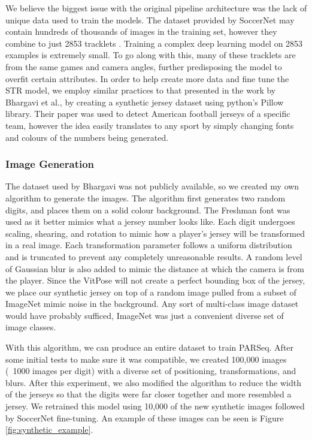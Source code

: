 \documentclass[11pt, letterpaper]{article}
\begin{document}
We believe the biggest issue with the original pipeline architecture was the lack of unique data used to train the models. The dataset provided by SoccerNet may contain hundreds of thousands of images in the training set, however they combine to just 2853 tracklets \cite{soccernet_repo}. Training a complex deep learning model on 2853 examples is extremely small. To go along with this, many of these tracklets are from the same games and camera angles, further predisposing the model to overfit certain attributes. In order to help create more data and fine tune the STR model, we employ similar practices to that presented in the work by Bhargavi et al., by creating a synthetic jersey dataset using python's Pillow library. Their paper was used to detect American football jerseys of a specific team, however the idea easily translates to any sport by simply changing fonts and colours of the numbers being generated. 

\subsubsection{Image Generation}

The dataset used by Bhargavi was not publicly available, so we created my own algorithm to generate the images. The algorithm first generates two random digits, and places them on a solid colour background. The Freshman font was used as it better mimics what a jersey number looks like. Each digit undergoes scaling, shearing, and rotation to mimic how a player's jersey will be transformed in a real image. Each transformation parameter follows a uniform distribution and is truncated to prevent any completely unreasonable results. A random level of Gaussian blur is also added to mimic the distance at which the camera is from the player. Since the VitPose will not create a perfect bounding box of the jersey, we place our synthetic jersey on top of a random image pulled from a subset of ImageNet mimic noise in the background. Any sort of multi-class image dataset would have probably sufficed, ImageNet was just a convenient diverse set of image classes.

With this algorithm, we can produce an entire dataset to train PARSeq. After some initial tests to make sure it was compatible, we created 100,000 images (~1000 images per digit) with a diverse set of positioning, transformations, and blurs. After this experiment, we also modified the algorithm to reduce the width of the jerseys so that the digits were far closer together and more resembled a jersey. We retrained this model using 10,000 of the new synthetic images followed by SoccerNet fine-tuning. An example of these images can be seen is Figure \ref{fig:synthetic_example}.
\end{document}
